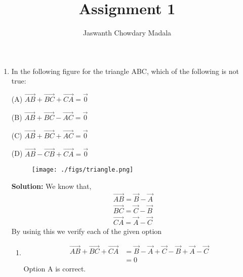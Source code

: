 \documentclass[journal,12pt,twocolumn]{IEEEtran}
\begin{document}
\vspace{3cm}


\title{Assignment 1}
\author{Jaswanth Chowdary Madala}





\maketitle

\newpage


\bigskip

\renewcommand{\thefigure}{\theenumi}
\renewcommand{\thetable}{\theenumi}

\begin{enumerate}
\item In the following figure for the triangle ABC, which of the following is not true:

(A) $\overrightarrow{AB}+\overrightarrow{BC}+\overrightarrow{CA} = \overrightarrow{0}$

(B) $\overrightarrow{AB}+\overrightarrow{BC}-\overrightarrow{AC} = \overrightarrow{0}$

(C) $\overrightarrow{AB}+\overrightarrow{BC}+\overrightarrow{AC} = \overrightarrow{0}$

(D) $\overrightarrow{AB}-\overrightarrow{CB}+\overrightarrow{CA} = \overrightarrow{0}$

\begin{figure}[h]
\centering
\texttt{[image: ./figs/triangle.png]}
\caption{}
\end{figure}
\textbf{Solution:} We know that,
\begin{align}
\overrightarrow{AB} = \vec{B} - \vec{A}\\
\overrightarrow{BC} = \vec{C} - \vec{B}\\
\overrightarrow{CA} = \vec{A} - \vec{C}
\end{align}
By usinig this we verify each of the given option

\begin{enumerate}
\item 
\begin{align}
\overrightarrow{AB}+\overrightarrow{BC}+\overrightarrow{CA} &=
\vec{B}-\vec{A} + \vec{C} - \vec{B} + \vec{A} - \vec{C}\\
 &= 0
\end{align}
Option A is correct.\\


\end{enumerate}
\end{enumerate}
\end{document}
